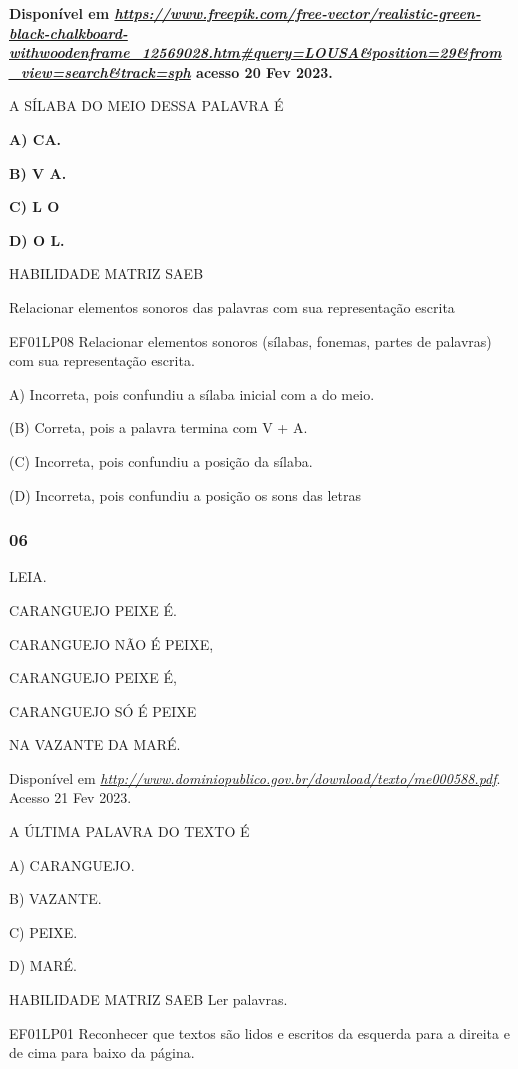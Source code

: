 \textbf{Disponível em
\href{https://www.freepik.com/free-vector/realistic-green-black-chalkboard-withwoodenframe_12569028.htm\#query=LOUSA\&position=29\&from_view=search\&track=sph}{\emph{https://www.freepik.com/free-vector/realistic-green-black-chalkboard-withwoodenframe\_12569028.htm\#query=LOUSA\&position=29\&from\_view=search\&track=sph}}
acesso 20 Fev 2023.}

A SÍLABA DO MEIO DESSA PALAVRA É

\textbf{A) CA.}

\textbf{B) V A.}

\textbf{C) L O}

\textbf{D) O L.}

HABILIDADE MATRIZ SAEB

Relacionar elementos sonoros das palavras com sua representação escrita

EF01LP08 Relacionar elementos sonoros (sílabas, fonemas, partes de
palavras) com sua representação escrita.

A) Incorreta, pois confundiu a sílaba inicial com a do meio.

(B) Correta, pois a palavra termina com V + A.

(C) Incorreta, pois confundiu a posição da sílaba.

(D) Incorreta, pois confundiu a posição os sons das letras

\subsubsection{06}\label{section-62}

LEIA.

CARANGUEJO PEIXE É.

CARANGUEJO NÃO É PEIXE,

CARANGUEJO PEIXE É,

CARANGUEJO SÓ É PEIXE

NA VAZANTE DA MARÉ.

Disponível em
\href{http://www.dominiopublico.gov.br/download/texto/me000588.pdf}{\emph{http://www.dominiopublico.gov.br/download/texto/me000588.pdf}}.
Acesso 21 Fev 2023.

A ÚLTIMA PALAVRA DO TEXTO É

A) CARANGUEJO.

B) VAZANTE.

C) PEIXE.

D) MARÉ.

HABILIDADE MATRIZ SAEB Ler palavras.

EF01LP01 Reconhecer que textos são lidos e escritos da esquerda para a
direita e de cima para baixo da página.

